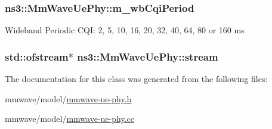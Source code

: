 \subsubsection[{\texorpdfstring{m\+\_\+wb\+Cqi\+Period}{m_wbCqiPeriod}}]{ ns3\+::\+Mm\+Wave\+Ue\+Phy\+::m\+\_\+wb\+Cqi\+Period\hspace{0.3cm}{\ttfamily [private]}}\hypertarget{classns3_1_1MmWaveUePhy_ac29bad9930696fd4f813d29585a55c8a}{}\label{classns3_1_1MmWaveUePhy_ac29bad9930696fd4f813d29585a55c8a}
Wideband Periodic C\+QI\+: 2, 5, 10, 16, 20, 32, 40, 64, 80 or 160 ms 
\subsubsection[{\texorpdfstring{stream}{stream}}]{\setlength{\rightskip}{0pt plus 5cm}std\+::ofstream$\ast$ ns3\+::\+Mm\+Wave\+Ue\+Phy\+::stream\hspace{0.3cm}{\ttfamily [private]}}\hypertarget{classns3_1_1MmWaveUePhy_a90953f3aea8003a19f264b061f828507}{}\label{classns3_1_1MmWaveUePhy_a90953f3aea8003a19f264b061f828507}


The documentation for this class was generated from the following files\+:\begin{DoxyCompactItemize}
\item 
mmwave/model/\hyperlink{mmwave-ue-phy_8h}{mmwave-\/ue-\/phy.\+h}\item 
mmwave/model/\hyperlink{mmwave-ue-phy_8cc}{mmwave-\/ue-\/phy.\+cc}\end{DoxyCompactItemize}
